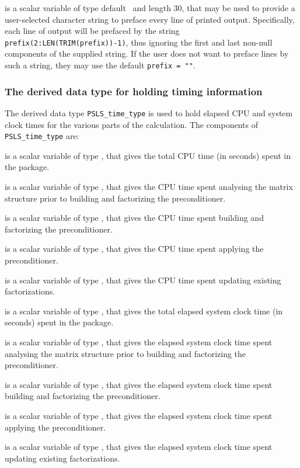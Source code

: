 \documentclass{galahad}
\newcommand{\packagename}{PSLS}
\begin{document}
\begin{description}
 is a scalar variable of type default \character\
and length 30, that may be used to provide a user-selected
character string to preface every line of printed output.
Specifically, each line of output will be prefaced by the string
{\tt prefix(2:LEN(TRIM(prefix))-1)},
thus ignoring the first and last non-null components of the
supplied string. If the user does not want to preface lines by such
a string, they may use the default {\tt prefix = ""}.

\end{description}


\subsubsection{The derived data type for holding timing
 information}\label{typetime}
The derived data type
{\tt \packagename\_time\_type}
is used to hold elapsed CPU and system clock times for the various parts
of the calculation. The components of
{\tt \packagename\_time\_type}
are:
\begin{description}
 is a scalar variable of type \realdp, that gives
 the total CPU time (in seconds) spent in the package.

 is a scalar variable of type \realdp, that gives
 the CPU time spent analysing the matrix structure prior to building and
 factorizing the preconditioner.

 is a scalar variable of type \realdp, that gives
 the CPU time spent building and factorizing the preconditioner.

 is a scalar variable of type \realdp, that gives
 the CPU time spent applying the preconditioner.

 is a scalar variable of type \realdp, that gives
 the CPU time spent updating existing factorizations.

 is a scalar variable of type \realdp, that gives
 the total elapsed system clock time (in seconds) spent in the package.

 is a scalar variable of type \realdp, that gives
 the elapsed system clock time spent analysing the matrix structure prior to 
 building and factorizing the preconditioner.

 is a scalar variable of type \realdp, that gives
 the elapsed system clock time spent building and factorizing the 
 preconditioner.

 is a scalar variable of type \realdp, that gives
 the elapsed system clock time spent applying the preconditioner.

 is a scalar variable of type \realdp,
 that gives  the elapsed system clock time spent updating existing 
 factorizations.

\end{description}
\end{document}
